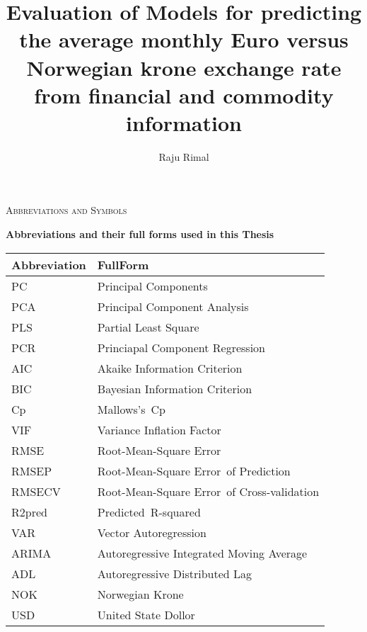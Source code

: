 \documentclass[12pt, lot, lof]{thesis}\usepackage[]{graphicx}\usepackage[]{color}
\title{Evaluation of Models for predicting the average monthly Euro versus Norwegian krone exchange rate from financial and commodity information}
\author{Raju Rimal}
\begin{document}
\makefrontmatter











\clearpage
{}


\begin{center}\textsc{\Large{Abbreviations and Symbols}}\end{center}

\begin{center}\textbf{Abbreviations and their full forms used in this Thesis}\end{center}
\nopagebreak
\begin{tabularx}{\textwidth}{lX}
  \toprule
Abbreviation & FullForm \\ 
  \hline \endhead  \midrule
PC & Principal Components \\ 
  PCA & Principal Component Analysis \\ 
  PLS & Partial Least Square \\ 
  PCR & Princiapal Component Regression \\ 
  AIC & Akaike Information Criterion \\ 
  BIC & ‎Bayesian Information Criterion \\ 
  Cp & Mallows's Cp \\ 
  VIF & Variance Inflation Factor \\ 
  RMSE & Root-Mean-Square Error  \\ 
  RMSEP & Root-Mean-Square Error of Prediction \\ 
  RMSECV & Root-Mean-Square Error of Cross-validation \\ 
  R2pred & Predicted R-squared \\ 
  VAR & Vector Autoregression \\ 
  ARIMA & Autoregressive Integrated Moving Average \\ 
  ADL & Autoregressive Distributed Lag \\ 
  NOK & Norwegian Krone \\ 
  USD & United State Dollor \\ 
   \bottomrule
\end{tabularx}
\end{document}

